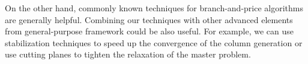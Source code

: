On the other hand,  commonly known techniques for branch-and-price algorithms are generally helpful. Combining our techniques with other advanced elements from general-purpose framework \cite{pessoa2021solving} could be also useful. For example, we can use stabilization techniques to speed up the convergence of the column generation or use cutting planes to tighten the relaxation of the master problem.









 



 






